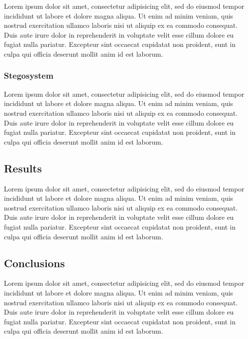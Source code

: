 \documentclass[draft]{IIBproject}
\begin{document}
Lorem ipsum dolor sit amet, consectetur adipisicing elit, sed do eiusmod tempor incididunt ut labore et dolore magna aliqua. Ut enim ad minim veniam, quis nostrud exercitation ullamco laboris nisi ut aliquip ex ea commodo consequat. Duis aute irure dolor in reprehenderit in voluptate velit esse cillum dolore eu fugiat nulla pariatur. Excepteur sint occaecat cupidatat non proident, sunt in culpa qui officia deserunt mollit anim id est laborum.

\subsubsection*{Stegosystem}

Lorem ipsum dolor sit amet, consectetur adipisicing elit, sed do eiusmod tempor incididunt ut labore et dolore magna aliqua. Ut enim ad minim veniam, quis nostrud exercitation ullamco laboris nisi ut aliquip ex ea commodo consequat. Duis aute irure dolor in reprehenderit in voluptate velit esse cillum dolore eu fugiat nulla pariatur. Excepteur sint occaecat cupidatat non proident, sunt in culpa qui officia deserunt mollit anim id est laborum.

\subsection*{Results}

Lorem ipsum dolor sit amet, consectetur adipisicing elit, sed do eiusmod tempor incididunt ut labore et dolore magna aliqua. Ut enim ad minim veniam, quis nostrud exercitation ullamco laboris nisi ut aliquip ex ea commodo consequat. Duis aute irure dolor in reprehenderit in voluptate velit esse cillum dolore eu fugiat nulla pariatur. Excepteur sint occaecat cupidatat non proident, sunt in culpa qui officia deserunt mollit anim id est laborum.

\subsection*{Conclusions}

Lorem ipsum dolor sit amet, consectetur adipisicing elit, sed do eiusmod tempor incididunt ut labore et dolore magna aliqua. Ut enim ad minim veniam, quis nostrud exercitation ullamco laboris nisi ut aliquip ex ea commodo consequat. Duis aute irure dolor in reprehenderit in voluptate velit esse cillum dolore eu fugiat nulla pariatur. Excepteur sint occaecat cupidatat non proident, sunt in culpa qui officia deserunt mollit anim id est laborum.
\end{document}
